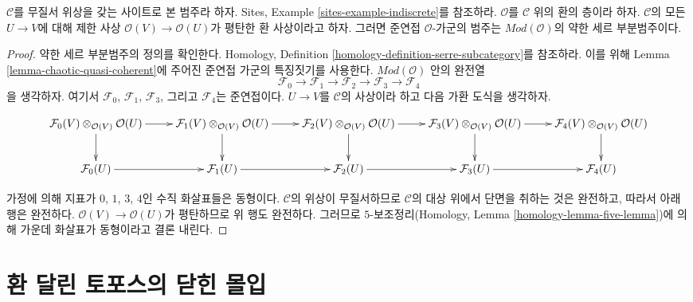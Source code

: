 \begin{lemma}
\label{lemma-chaotic-flat-quasi-coherent}
$\mathcal{C}$를 무질서 위상을 갖는 사이트로 본 범주라 하자. Sites, Example
\ref{sites-example-indiscrete}를 참조하라. $\mathcal{O}$를 $\mathcal{C}$ 위의
환의 층이라 하자. $\mathcal{C}$의 모든 $U \to V$에 대해 제한 사상
$\mathcal{O}(V) \to \mathcal{O}(U)$가 평탄한 환 사상이라고 하자. 그러면
준연접 $\mathcal{O}$-가군의 범주는 $\textit{Mod}(\mathcal{O})$의 약한 세르
부분범주이다.
\end{lemma}

\begin{proof}
약한 세르 부분범주의 정의를 확인한다. Homology, Definition
\ref{homology-definition-serre-subcategory}를 참조하라. 이를 위해 Lemma
\ref{lemma-chaotic-quasi-coherent}에 주어진 준연접 가군의 특징짓기를
사용한다. $\textit{Mod}(\mathcal{O})$ 안의 완전열
$$
\mathcal{F}_0 \to \mathcal{F}_1 \to
\mathcal{F}_2 \to \mathcal{F}_3 \to
\mathcal{F}_4
$$
을 생각하자. 여기서 $\mathcal{F}_0$, $\mathcal{F}_1$,
$\mathcal{F}_3$, 그리고 $\mathcal{F}_4$는 준연접이다. $U \to V$를
$\mathcal{C}$의 사상이라 하고 다음 가환 도식을 생각하자.
\par\noindent\hspace*{.5\textwidth}\hspace*{-.5\paperwidth}\hspace*{34pt}%
\parbox{\paperwidth}{%
$$
\xymatrix{
\mathcal{F}_0(V) \otimes_{\mathcal{O}(V)} \mathcal{O}(U) \ar[r] \ar[d] &
\mathcal{F}_1(V) \otimes_{\mathcal{O}(V)} \mathcal{O}(U) \ar[r] \ar[d] &
\mathcal{F}_2(V) \otimes_{\mathcal{O}(V)} \mathcal{O}(U) \ar[r] \ar[d] &
\mathcal{F}_3(V) \otimes_{\mathcal{O}(V)} \mathcal{O}(U) \ar[r] \ar[d] &
\mathcal{F}_4(V) \otimes_{\mathcal{O}(V)} \mathcal{O}(U) \ar[d] \\
\mathcal{F}_0(U) \ar[r] &
\mathcal{F}_1(U) \ar[r] &
\mathcal{F}_2(U) \ar[r] &
\mathcal{F}_3(U) \ar[r] &
\mathcal{F}_4(U)
}
$$
}%
\par
가정에 의해 지표가 $0$, $1$, $3$, $4$인 수직 화살표들은 동형이다.
$\mathcal{C}$의 위상이 무질서하므로 $\mathcal{C}$의 대상 위에서 단면을
취하는 것은 완전하고, 따라서 아래 행은 완전하다.
$\mathcal{O}(V) \to \mathcal{O}(U)$가 평탄하므로 위 행도 완전하다.
그러므로 $5$-보조정리(Homology, Lemma \ref{homology-lemma-five-lemma})에
의해 가운데 화살표가 동형이라고 결론 내린다.
\end{proof}






\section{환 달린 토포스의 닫힌 몰입}
\label{section-closed-immersion}

